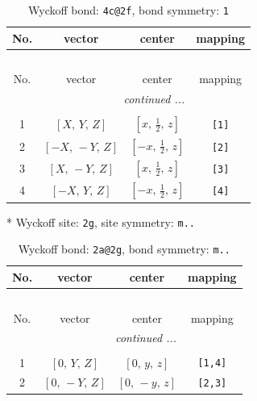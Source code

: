\documentclass[fleqn,8pt]{jsarticle}
\begin{document}
\begin{longtable}{cccc}
\caption{Wyckoff bond: {\tt 4c@2f}, bond symmetry: {\tt 1}}
 \\
 \hline \hline
No. & vector & center & mapping \\ \hline \endfirsthead

\multicolumn{3}{l}{\tablename\ \thetable{}} \\
 \hline \hline
No. & vector & center & mapping \\ \hline \endhead

 \hline \hline
\multicolumn{3}{r}{\footnotesize\it continued ...} \\ \endfoot

 \hline \hline
\multicolumn{3}{r}{} \\ \endlastfoot

1 & $\left[ X,\, Y,\, Z \right]$ & $\left[ x,\, \frac{1}{2},\, z \right]$ & {\tt [1]} \\ \hline
2 & $\left[ - X,\, - Y,\, Z \right]$ & $\left[ - x,\, \frac{1}{2},\, z \right]$ & {\tt [2]} \\ \hline
3 & $\left[ X,\, - Y,\, Z \right]$ & $\left[ x,\, \frac{1}{2},\, z \right]$ & {\tt [3]} \\ \hline
4 & $\left[ - X,\, Y,\, Z \right]$ & $\left[ - x,\, \frac{1}{2},\, z \right]$ & {\tt [4]} \\
\end{longtable}
* Wyckoff site: {\tt 2g}, site symmetry: {\tt m..}
\renewcommand{\arraystretch}{1.2}
\begin{longtable}{cccc}
\caption{Wyckoff bond: {\tt 2a@2g}, bond symmetry: {\tt m..}}
 \\
 \hline \hline
No. & vector & center & mapping \\ \hline \endfirsthead

\multicolumn{3}{l}{\tablename\ \thetable{}} \\
 \hline \hline
No. & vector & center & mapping \\ \hline \endhead

 \hline \hline
\multicolumn{3}{r}{\footnotesize\it continued ...} \\ \endfoot

 \hline \hline
\multicolumn{3}{r}{} \\ \endlastfoot

1 & $\left[ 0,\, Y,\, Z \right]$ & $\left[ 0,\, y,\, z \right]$ & {\tt [1,4]} \\ \hline
2 & $\left[ 0,\, - Y,\, Z \right]$ & $\left[ 0,\, - y,\, z \right]$ & {\tt [2,3]} \\
\end{longtable}
\end{document}
